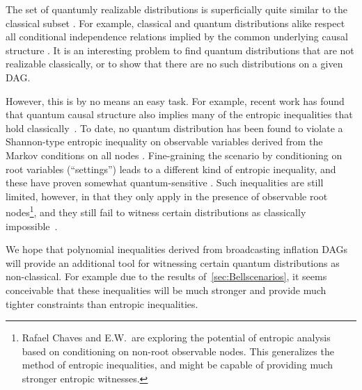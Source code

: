 The set of quantumly realizable distributions is superficially quite similar to the classical subset \cite{pusey2014gdag,fritz2012bell}. For example, classical and quantum distributions alike respect all conditional independence relations implied by the common underlying causal structure \cite{pusey2014gdag}. It is an interesting problem to find quantum distributions that are not realizable classically, or to show that there are no such distributions on a given DAG.

However, this is by no means an easy task. For example, recent work has found that quantum causal structure also implies many of the entropic inequalities that hold classically~\cite{pusey2014gdag,Chaves2015infoquantum,ChavesNoSignalling}. To date, no quantum distribution has been found to violate a Shannon-type entropic inequality on observable variables derived from the Markov conditions on all nodes \cite{chaves2012entropic,fritz2012bell}. Fine-graining the scenario by conditioning on root variables (``settings'') leads to a different kind of entropic inequality, and these have proven somewhat quantum-sensitive \cite{braunstein1988entropic,SchumacherInequality,chaves2014novel}. Such inequalities are still limited, however, in that they only apply in the presence of observable root nodes\footnote{Rafael Chaves and E.W.~are exploring the potential of entropic analysis based on conditioning on non-root observable nodes. This generalizes the method of entropic inequalities, and might be capable of providing much stronger entropic witnesses.}, and they still fail to witness certain distributions as classically impossible~\cite{chaves2014novel,fritz2012bell}.

We hope that polynomial inequalities derived from broadcasting inflation DAGs will provide an additional tool for witnessing certain quantum distributions as non-classical. For example due to the results of~\cref{sec:Bellscenarios}, it seems conceivable that these inequalities will be much stronger and provide much tighter constraints than entropic inequalities.

